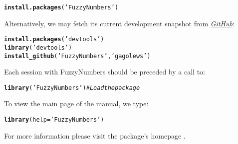 \documentclass[11pt]{article}\usepackage[]{graphicx}\usepackage[]{color}
\makeatletter
\newcommand{\hlstr}[1]{\textcolor[rgb]{0.192,0.494,0.8}{#1}}%
\newcommand{\hlcom}[1]{\textcolor[rgb]{0.678,0.584,0.686}{\textit{#1}}}%
\newcommand{\hlstd}[1]{\textcolor[rgb]{0.345,0.345,0.345}{#1}}%
\newcommand{\hlkwc}[1]{\textcolor[rgb]{0.333,0.667,0.333}{#1}}%
\newcommand{\hlkwd}[1]{\textcolor[rgb]{0.737,0.353,0.396}{\textbf{#1}}}%
\newenvironment{kframe}{%
 \def\at@end@of@kframe{}%
 \ifinner\ifhmode%
  \def\at@end@of@kframe{\end{minipage}}%
  \begin{minipage}{\columnwidth}%
 \fi\fi%
 \def\FrameCommand##1{\hskip\@totalleftmargin \hskip-\fboxsep
 \colorbox{shadecolor}{##1}\hskip-\fboxsep
     \hskip-\linewidth \hskip-\@totalleftmargin \hskip\columnwidth}%
 \MakeFramed {\advance\hsize-\width
   \@totalleftmargin\z@ \linewidth\hsize
   \@setminipage}}%
 {\par\unskip\endMakeFramed%
 \at@end@of@kframe}
\newenvironment{knitrout}{}{} %
\newcommand{\package}[1]{\textsf{#1}\xspace}
\makeatother
\begin{document}
\begin{knitrout}\small
{}\color{fgcolor}\begin{kframe}
\begin{alltt}
\hlkwd{install.packages}\hlstd{(}\hlstr{'FuzzyNumbers'}\hlstd{)}
\end{alltt}
\end{kframe}
\end{knitrout}

\noindent
Alternatively, we may fetch its current development snapshot
from \href{https://github.com/gagolews/FuzzyNumbers}{\textit{GitHub}}:

\begin{knitrout}\small
{}\color{fgcolor}\begin{kframe}
\begin{alltt}
\hlkwd{install.packages}\hlstd{(}\hlstr{'devtools'}\hlstd{)}
\hlkwd{library}\hlstd{(}\hlstr{'devtools'}\hlstd{)}
\hlkwd{install_github}\hlstd{(}\hlstr{'FuzzyNumbers'}\hlstd{,} \hlstr{'gagolews'}\hlstd{)}
\end{alltt}
\end{kframe}
\end{knitrout}


\bigskip
Each session with \package{FuzzyNumbers} should be preceded by
a call to:

\begin{knitrout}\small
{}\color{fgcolor}\begin{kframe}
\begin{alltt}
\hlkwd{library}\hlstd{(}\hlstr{'FuzzyNumbers'}\hlstd{)} \hlcom{# Load the package}
\end{alltt}
\end{kframe}
\end{knitrout}

\bigskip
To view the main page of the manual, we type:

\begin{knitrout}\small
{}\color{fgcolor}\begin{kframe}
\begin{alltt}
\hlkwd{library}\hlstd{(}\hlkwc{help}\hlstd{=}\hlstr{'FuzzyNumbers'}\hlstd{)}
\end{alltt}
\end{kframe}
\end{knitrout}

\noindent
For more information please visit the package's homepage
\cite{Gagolewski:fuzzynumberspackage}.
\end{document}
